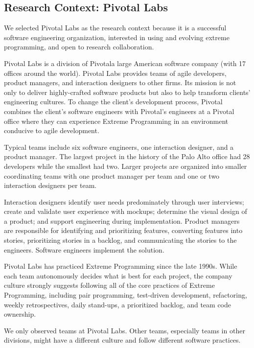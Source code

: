 \subsection{Research Context: Pivotal Labs}
We selected Pivotal Labs as the research context because it is a successful software engineering organization, interested in using and evolving extreme programming, and open to research collaboration. 

Pivotal Labs is a division of Pivotal\textemdash a large American software company (with 17 offices around the world). Pivotal Labs provides teams of agile developers, product managers, and interaction designers to other firms. Its mission is not only to deliver highly-crafted software products but also to help transform clients' engineering cultures. To change the client's development process, Pivotal combines the client's software engineers with Pivotal's engineers at a Pivotal office where they can experience Extreme Programming \cite{BeckExtremeProgramming2004} in an environment conducive to agile development. 

Typical teams include six software engineers, one interaction designer, and a product manager. The largest project in the history of the Palo Alto office had 28 developers while the smallest had two. Larger projects are organized into smaller coordinating teams with one product manager per team and one or two interaction designers per team.

Interaction designers identify user needs predominately through user interviews; create and validate user experience with mockups; determine the visual design of a product; and support engineering during implementation. Product managers are responsible for identifying and prioritizing features, converting features into stories, prioritizing stories in a backlog, and communicating the stories to the engineers. Software engineers implement the solution. 

Pivotal Labs has practiced Extreme Programming \cite{BeckExtremeProgramming2004} since the late 1990s. While each team autonomously decides what is best for each project, the company culture strongly suggests following all of the core practices of Extreme Programming, including pair programming, test-driven development, refactoring, weekly retrospectives, daily stand-ups, a prioritized backlog, and team code ownership. 

We only observed teams at Pivotal Labs. Other teams, especially teams in other divisions, might have a different culture and follow different software practices.


